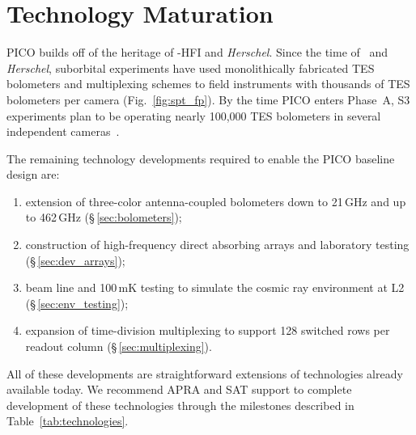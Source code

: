 \section{Technology Maturation}
\label{sec:technology_maturation} %

PICO builds off of the heritage of \planck-HFI and \textit{Herschel}.  Since the time of \planck\ and \textit{Herschel}, suborbital experiments have used monolithically fabricated TES bolometers and multiplexing schemes to field instruments with thousands of \ac{TES} bolometers per camera (Fig.~\ref{fig:spt_fp}). By the time PICO enters Phase~A, S3 experiments plan to be operating nearly 100,000 \ac{TES} bolometers in several independent cameras~\citep{Simons2018,biceparray,spt3g}.

 The remaining technology developments required to enable the PICO baseline design are:
\begin{enumerate}
\item extension of three-color antenna-coupled bolometers down to 21\,GHz and up to 462\,GHz (\S\,\ref{sec:bolometers});
\item construction of high-frequency direct absorbing arrays and laboratory testing (\S\,\ref{sec:dev_arrays});
\item beam line and 100\,mK testing to simulate the cosmic ray environment at L2 (\S\,\ref{sec:env_testing});
\item expansion of time-division multiplexing to support 128 switched rows per readout column (\S\,\ref{sec:multiplexing}).
\end{enumerate}
All of these developments are straightforward extensions of technologies already available today.  We recommend APRA and SAT support to complete development of these technologies through the milestones described in Table~\ref{tab:technologies}.

